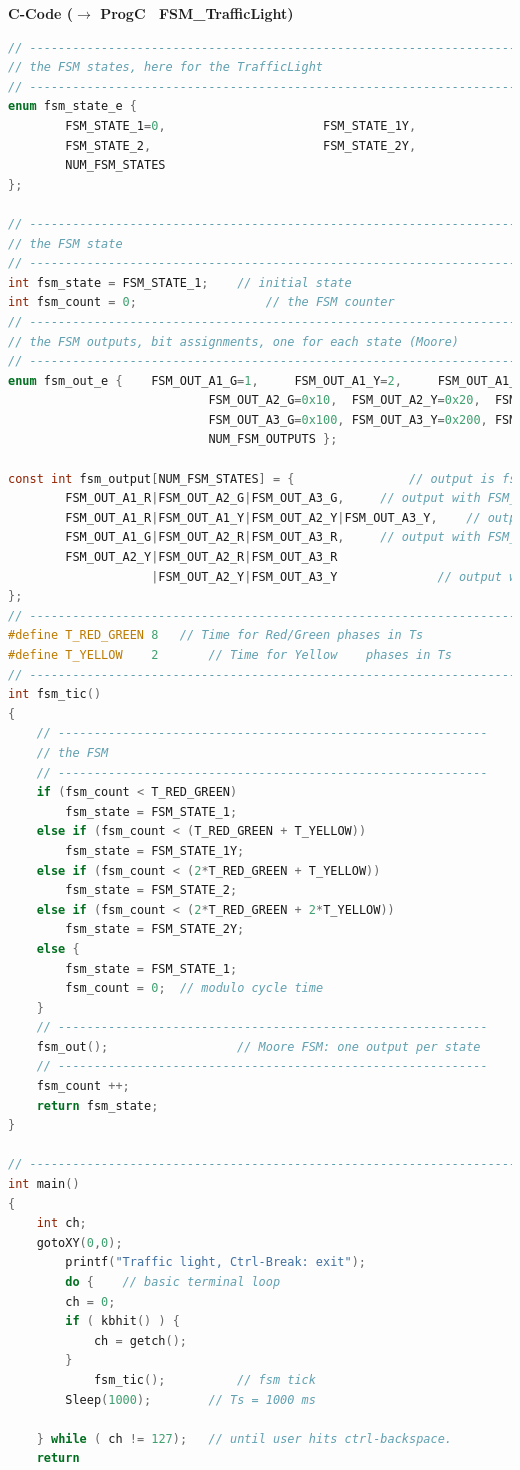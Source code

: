 {\rot\bf C-Code	($\rightarrow$ ProgC \ FSM\_TrafficLight)}\\

\begin{lstlisting}[style=mystyle, language=c]
// ----------------------------------------------------------------------------
// the FSM states, here for the TrafficLight
// ----------------------------------------------------------------------------
enum fsm_state_e {
		FSM_STATE_1=0, 						FSM_STATE_1Y,
		FSM_STATE_2, 						FSM_STATE_2Y,
		NUM_FSM_STATES
};

// ----------------------------------------------------------------------------
// the FSM state
// ----------------------------------------------------------------------------
int fsm_state = FSM_STATE_1;	// initial state
int fsm_count = 0;					// the FSM counter
// ----------------------------------------------------------------------------
// the FSM outputs, bit assignments, one for each state (Moore)
// ----------------------------------------------------------------------------
enum fsm_out_e {	FSM_OUT_A1_G=1, 	FSM_OUT_A1_Y=2, 	FSM_OUT_A1_R=4,
							FSM_OUT_A2_G=0x10, 	FSM_OUT_A2_Y=0x20, 	FSM_OUT_A2_R=0x40,
							FSM_OUT_A3_G=0x100, FSM_OUT_A3_Y=0x200, FSM_OUT_A3_R=0x400,
							NUM_FSM_OUTPUTS };

const int fsm_output[NUM_FSM_STATES] = {				// output is fsm_output[fsm_state]
		FSM_OUT_A1_R|FSM_OUT_A2_G|FSM_OUT_A3_G,		// output with FSM_STATE_1
		FSM_OUT_A1_R|FSM_OUT_A1_Y|FSM_OUT_A2_Y|FSM_OUT_A3_Y,	// output with FSM_STATE_1Y
		FSM_OUT_A1_G|FSM_OUT_A2_R|FSM_OUT_A3_R,		// output with FSM_STATE_2
		FSM_OUT_A2_Y|FSM_OUT_A2_R|FSM_OUT_A3_R
					|FSM_OUT_A2_Y|FSM_OUT_A3_Y				// output with FSM_STATE_2Y
};
// ----------------------------------------------------------------------------
#define T_RED_GREEN	8	// Time for Red/Green phases in Ts
#define T_YELLOW	2		// Time for Yellow    phases in Ts
// ----------------------------------------------------------------------------
int fsm_tic()
{
	// ------------------------------------------------------------
	// the FSM 
	// ------------------------------------------------------------
	if (fsm_count < T_RED_GREEN)
		fsm_state = FSM_STATE_1;
	else if (fsm_count < (T_RED_GREEN + T_YELLOW))
		fsm_state = FSM_STATE_1Y;
	else if (fsm_count < (2*T_RED_GREEN + T_YELLOW))
		fsm_state = FSM_STATE_2;
	else if (fsm_count < (2*T_RED_GREEN + 2*T_YELLOW))
		fsm_state = FSM_STATE_2Y;
	else {
		fsm_state = FSM_STATE_1;
		fsm_count = 0;	// modulo cycle time
	}
	// ------------------------------------------------------------
	fsm_out();					// Moore FSM: one output per state
	// ------------------------------------------------------------
	fsm_count ++;
	return fsm_state;
}

// ----------------------------------------------------------------------------
int main()
{
	int ch;
	gotoXY(0,0);
  		printf("Traffic light, Ctrl-Break: exit");
    	do {	// basic terminal loop
        ch = 0;
        if ( kbhit() ) {
            ch = getch();
        }
			fsm_tic();			// fsm tick
        Sleep(1000);		// Ts = 1000 ms

    } while ( ch != 127);	// until user hits ctrl-backspace.
	return 

\end{lstlisting}


